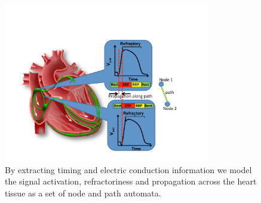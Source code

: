\begin{figure}[t]
		\centering
		\includegraphics[width=0.8\textwidth]{figs/heartmodel.pdf}
		\caption{\small By extracting timing and electric conduction information we model the signal activation, refractoriness and propagation across the heart tissue as a set of node and path automata.}
		\label{fig:heartmodel}
\end{figure}
